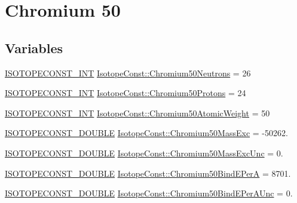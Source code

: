 \hypertarget{group___isotope_const-_chromium-_cr50}{}\section{Chromium 50}
\label{group___isotope_const-_chromium-_cr50}
\subsection*{Variables}
\begin{DoxyCompactItemize}
\item 
\mbox{\hyperlink{group___isotope_const-_macros_ga5f18360b3e99483a35c32d789e62621c}{I\+S\+O\+T\+O\+P\+E\+C\+O\+N\+S\+T\+\_\+\+I\+NT}} \mbox{\hyperlink{group___isotope_const-_chromium-_cr50_ga4188d9867961a029dddeecce105b31ee}{Isotope\+Const\+::\+Chromium50\+Neutrons}} = 26
\item 
\mbox{\hyperlink{group___isotope_const-_macros_ga5f18360b3e99483a35c32d789e62621c}{I\+S\+O\+T\+O\+P\+E\+C\+O\+N\+S\+T\+\_\+\+I\+NT}} \mbox{\hyperlink{group___isotope_const-_chromium-_cr50_ga6a2fe59f296741b26a19830ab2b1bc15}{Isotope\+Const\+::\+Chromium50\+Protons}} = 24
\item 
\mbox{\hyperlink{group___isotope_const-_macros_ga5f18360b3e99483a35c32d789e62621c}{I\+S\+O\+T\+O\+P\+E\+C\+O\+N\+S\+T\+\_\+\+I\+NT}} \mbox{\hyperlink{group___isotope_const-_chromium-_cr50_gaf303cd8c6e1a4124ef71aade166f3880}{Isotope\+Const\+::\+Chromium50\+Atomic\+Weight}} = 50
\item 
\mbox{\hyperlink{group___isotope_const-_macros_ga8f45a7272ce02c0b4c65c44636ed719a}{I\+S\+O\+T\+O\+P\+E\+C\+O\+N\+S\+T\+\_\+\+D\+O\+U\+B\+LE}} \mbox{\hyperlink{group___isotope_const-_chromium-_cr50_ga03147e6a6c99332c834d051b560652e5}{Isotope\+Const\+::\+Chromium50\+Mass\+Exc}} = -\/50262.
\item 
\mbox{\hyperlink{group___isotope_const-_macros_ga8f45a7272ce02c0b4c65c44636ed719a}{I\+S\+O\+T\+O\+P\+E\+C\+O\+N\+S\+T\+\_\+\+D\+O\+U\+B\+LE}} \mbox{\hyperlink{group___isotope_const-_chromium-_cr50_ga91890ab7b1b5a1ab0ba02e632fb0caac}{Isotope\+Const\+::\+Chromium50\+Mass\+Exc\+Unc}} = 0.
\item 
\mbox{\hyperlink{group___isotope_const-_macros_ga8f45a7272ce02c0b4c65c44636ed719a}{I\+S\+O\+T\+O\+P\+E\+C\+O\+N\+S\+T\+\_\+\+D\+O\+U\+B\+LE}} \mbox{\hyperlink{group___isotope_const-_chromium-_cr50_ga1d33988218c0304636b9aafa04708b08}{Isotope\+Const\+::\+Chromium50\+Bind\+E\+PerA}} = 8701.
\item 
\mbox{\hyperlink{group___isotope_const-_macros_ga8f45a7272ce02c0b4c65c44636ed719a}{I\+S\+O\+T\+O\+P\+E\+C\+O\+N\+S\+T\+\_\+\+D\+O\+U\+B\+LE}} \mbox{\hyperlink{group___isotope_const-_chromium-_cr50_gacc4c53e6df6be5618ca5ee991e97f776}{Isotope\+Const\+::\+Chromium50\+Bind\+E\+Per\+A\+Unc}} = 0.

\end{DoxyCompactItemize}
